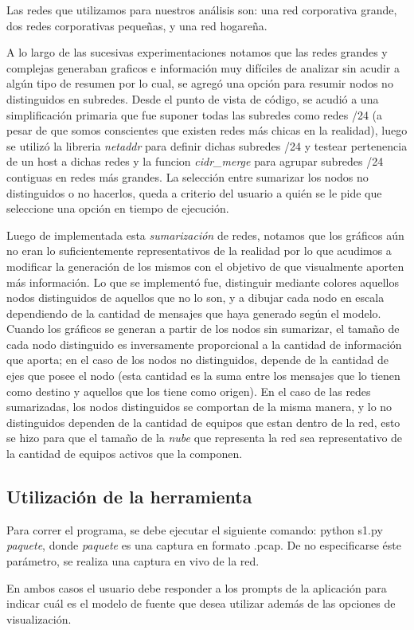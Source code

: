 Las redes que utilizamos para nuestros análisis son: una red corporativa grande, dos redes corporativas pequeñas, y una red hogareña.

A lo largo de las sucesivas experimentaciones notamos que las redes grandes y complejas generaban graficos e información muy difíciles de analizar sin acudir a algún tipo de resumen por lo cual, se agregó una opción para resumir nodos no distinguidos en subredes. Desde el punto de vista de código, se acudió a una simplificación primaria que fue suponer todas las subredes como redes /24 (a pesar de que somos conscientes que existen redes más chicas en la realidad), luego se utilizó la libreria \textit{netaddr} para definir dichas subredes /24 y testear pertenencia de un host a dichas redes y la funcion \textit{cidr\_merge} para agrupar subredes /24 contiguas en redes más grandes. La selección entre sumarizar los nodos no distinguidos o no hacerlos, queda a criterio del usuario a quién se le pide que seleccione una opción en tiempo de ejecución.

Luego de implementada esta \textit{sumarización} de redes, notamos que los gráficos aún no eran lo suficientemente representativos de la realidad por lo que acudimos a modificar la generación de los mismos con el objetivo de que visualmente aporten más información. Lo que se implementó fue, distinguir mediante colores aquellos nodos distinguidos de aquellos que no lo son, y a dibujar cada nodo en escala dependiendo de la cantidad de mensajes que haya generado según el modelo. Cuando los gráficos se generan a partir de los nodos sin sumarizar, el tamaño de cada nodo distinguido es inversamente proporcional a la cantidad de información que aporta; en el caso de los nodos no distinguidos, depende de la cantidad de ejes que posee el nodo (esta cantidad es la suma entre los mensajes que lo tienen como destino y aquellos que los tiene como origen). En el caso de las redes sumarizadas, los nodos distinguidos se comportan de la misma manera, y lo no distinguidos dependen de la cantidad de equipos que estan dentro de la red, esto se hizo para que el tamaño de la \textit{nube} que representa la red sea representativo de la cantidad de equipos activos que la componen.

\subsection{Utilización de la herramienta}
Para correr el programa, se debe ejecutar el siguiente comando: python s1.py \textit{paquete}, donde \textit{paquete} es una captura en formato .pcap. De no especificarse éste parámetro, se realiza una captura en vivo de la red.

En ambos casos el usuario debe responder a los prompts de la aplicación para indicar cuál es el modelo de fuente que desea utilizar además de las opciones de visualización.
